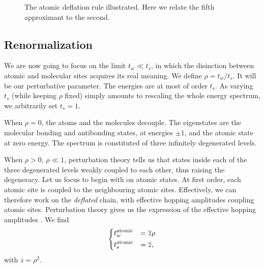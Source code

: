 \documentclass[aps,prl,preprint]{revtex4-1}
\newcommand{\zb}{\ensuremath{\overline{z}}}
\begin{document}
\begin{figure}[htp]
	
	\caption{The atomic deflation rule illustrated. Here we relate the fifth approximant to the second.}
\label{fig:at_defl}
\end{figure}

\subsection{Renormalization}

We are now going to focus on the limit $t_w \ll t_s$, in which the disinction between atomic and molecular sites acquires its real meaning.
We define $\rho = t_w/t_s$. It will be our perturbative parameter.
The energies are at most of order $t_s$. As varying $t_s$ (while keeping $\rho$ fixed) simply amounts to rescaling the whole energy spectrum, we arbitrarily set $t_s = 1$. 

When $\rho = 0$, the atoms and the molecules decouple. The eigenstates are the molecular bonding and antibonding states, at energies $\pm 1$, and the atomic state at zero energy.
The spectrum is constituted of three infinitely degenerated levels.

When $\rho > 0$, $\rho \ll 1$, perturbation theory tells us that states inside each of the three degenerated levels weakly coupled to each other, thus raising the degeneracy.
Let us focus to begin with on atomic states. At first order, each atomic site is coupled to the neighbouring atomic sites.
Effectively, we can therefore work on the \emph{deflated} chain, with effective hopping amplitudes coupling atomic sites. Perturbation theory gives us the expression of the effective hopping amplitudes \cite{Niu1990}.
We find
\begin{equation}
	\begin{dcases}
	t^\text{atomic}_w &= \zb \rho\\
	t^\text{atomic}_s &= \zb,
	\end{dcases}
\end{equation}
with $\zb =\rho^2$.
\end{document}
